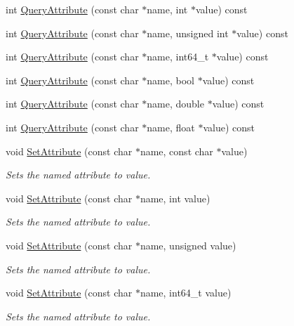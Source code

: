 \begin{DoxyCompactItemize}
int \hyperlink{classtinyxml2_1_1_x_m_l_element_a042fc30504347b84a56cf863ad528a4f}{Query\+Attribute} (const char $\ast$name, int $\ast$value) const
\item 
int \hyperlink{classtinyxml2_1_1_x_m_l_element_a187e8b686fbe071732aea2e2ee766f86}{Query\+Attribute} (const char $\ast$name, unsigned int $\ast$value) const
\item 
int \hyperlink{classtinyxml2_1_1_x_m_l_element_aedcac9a0842cc9fcb49ba6eee4dd47bc}{Query\+Attribute} (const char $\ast$name, int64\+\_\+t $\ast$value) const
\item 
int \hyperlink{classtinyxml2_1_1_x_m_l_element_a9aa67feb0392ead13a66f5ea55e71f64}{Query\+Attribute} (const char $\ast$name, bool $\ast$value) const
\item 
int \hyperlink{classtinyxml2_1_1_x_m_l_element_a7f37582f3ad9f9a765e6fa349dfbdfa0}{Query\+Attribute} (const char $\ast$name, double $\ast$value) const
\item 
int \hyperlink{classtinyxml2_1_1_x_m_l_element_a493b6dace830e4dba7110b1e9f6bebd5}{Query\+Attribute} (const char $\ast$name, float $\ast$value) const
\item 
void \hyperlink{classtinyxml2_1_1_x_m_l_element_a11943abf2d0831548c3790dd5d9f119c}{Set\+Attribute} (const char $\ast$name, const char $\ast$value)
\begin{DoxyCompactList}\small\item\em Sets the named attribute to value. \end{DoxyCompactList}\item 
void \hyperlink{classtinyxml2_1_1_x_m_l_element_aae6568c64c7f1cc88be8461ba41a79cf}{Set\+Attribute} (const char $\ast$name, int value)
\begin{DoxyCompactList}\small\item\em Sets the named attribute to value. \end{DoxyCompactList}\item 
void \hyperlink{classtinyxml2_1_1_x_m_l_element_ae143997e90064ba82326b29a9930ea8f}{Set\+Attribute} (const char $\ast$name, unsigned value)
\begin{DoxyCompactList}\small\item\em Sets the named attribute to value. \end{DoxyCompactList}\item 
void \hyperlink{classtinyxml2_1_1_x_m_l_element_aaeefdf9171fec91b13a776b42299b0dd}{Set\+Attribute} (const char $\ast$name, int64\+\_\+t value)
\begin{DoxyCompactList}\small\item\em Sets the named attribute to value. \end{DoxyCompactList}\item 

\end{DoxyCompactItemize}

